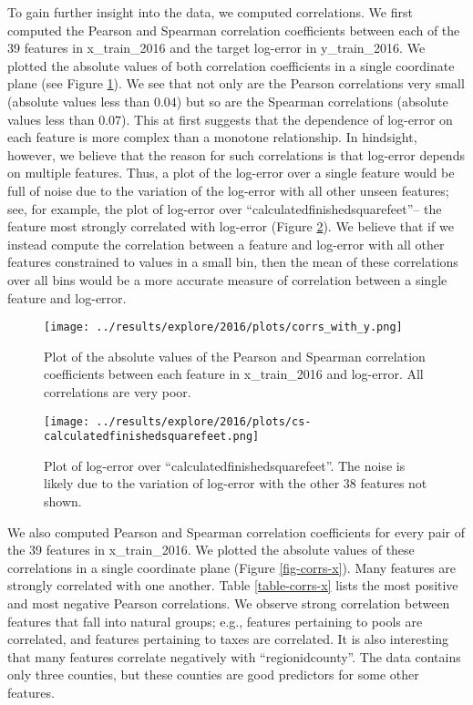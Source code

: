 \documentclass[12pt]{article}
\begin{document}
To gain further insight into the data, we computed correlations. We first computed the Pearson and Spearman correlation coefficients between each of the 39 features in x\_train\_2016 and the target log-error in y\_train\_2016. We plotted the absolute values of both correlation coefficients in a single coordinate plane (see Figure \ref{fig-corrs-with-y}). We see that not only are the Pearson correlations very small (absolute values less than $0.04$) but so are the Spearman correlations (absolute values less than $0.07$). This at first suggests that the dependence of log-error on each feature is more complex than a monotone relationship. In hindsight, however, we believe that the reason for such correlations is that log-error depends on multiple features. Thus, a plot of the log-error over a single feature would be full of noise due to the variation of the log-error with all other unseen features; see, for example, the plot of log-error over ``calculatedfinishedsquarefeet''-- the feature most strongly correlated with log-error (Figure \ref{fig-cs}). We believe that if we instead compute the correlation between a feature and log-error with all other features constrained to values in a small bin, then the mean of these correlations over all bins would be a more accurate measure of correlation between a single feature and log-error.

\begin{figure}
\centering
\texttt{[image: ../results/explore/2016/plots/corrs\_with\_y.png]}
\caption{\label{fig-corrs-with-y} Plot of the absolute values of the Pearson and Spearman correlation coefficients between each feature in x\_train\_2016 and log-error. All correlations are very poor.}
\end{figure}

\begin{figure}
\centering
\texttt{[image: ../results/explore/2016/plots/cs-calculatedfinishedsquarefeet.png]}
\caption{\label{fig-cs} Plot of log-error over ``calculatedfinishedsquarefeet''. The noise is likely due to the variation of log-error with the other 38 features not shown.}
\end{figure}

We also computed Pearson and Spearman correlation coefficients for every pair of the 39 features in x\_train\_2016. We plotted the absolute values of these correlations in a single coordinate plane (Figure \ref{fig-corrs-x}). Many features are strongly correlated with one another. Table \ref{table-corrs-x} lists the most positive and most negative Pearson correlations. We observe strong correlation between features that fall into natural groups; e.g., features pertaining to pools are correlated, and features pertaining to taxes are correlated. It is also interesting that many features correlate negatively with ``regionidcounty''. The data contains only three counties, but these counties are good predictors for some other features.
\end{document}
